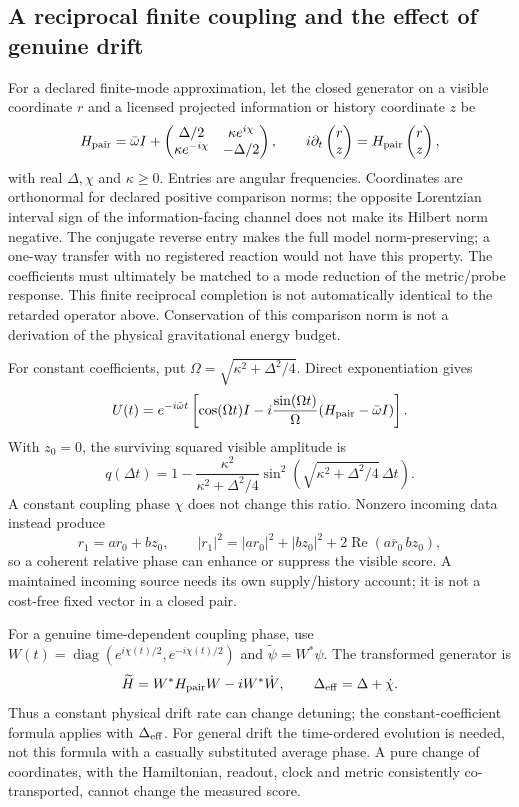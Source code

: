 \documentclass[11pt,a4paper]{article}
\begin{document}
\subsection{A reciprocal finite coupling and the effect of genuine drift}
For a declared finite-mode approximation, let the closed generator
on a visible coordinate $r$ and a licensed projected information or
history coordinate $z$ be
\[
 H_{\rm pair}=\bar\omega I+
 \begin{pmatrix}
 \Delta/2&\kappa e^{i\chi}\\
 \kappa e^{-i\chi}&-\Delta/2
 \end{pmatrix},
 \qquad i\partial_t\begin{pmatrix}r\\z\end{pmatrix}
 =H_{\rm pair}\begin{pmatrix}r\\z\end{pmatrix},
\]
with real $\Delta,\chi$ and $\kappa\ge0$. Entries are angular
frequencies. Coordinates are orthonormal for declared positive
comparison norms; the opposite Lorentzian interval sign of the
information-facing channel does not make its Hilbert norm negative.
The conjugate reverse entry makes the full model
norm-preserving; a one-way transfer with no registered reaction
would not have this property. The coefficients must ultimately be
matched to a mode reduction of the metric/probe response. This
finite reciprocal completion is not automatically identical to
the retarded operator above. Conservation of this comparison norm is
not a derivation of the physical gravitational energy budget.

For constant coefficients, put
$\Omega=\sqrt{\kappa^2+\Delta^2/4}$. Direct exponentiation gives
\[
 U(t)=e^{-i\bar\omega t}
 \left[\cos(\Omega t)I
 -i\frac{\sin(\Omega t)}{\Omega}
 (H_{\rm pair}-\bar\omega I)\right].
\]
With $z_0=0$, the surviving squared visible amplitude is
\[
 q(\Delta t)=1-
 \frac{\kappa^2}{\kappa^2+\Delta^2/4}
 \sin^2\!\left(\sqrt{\kappa^2+\Delta^2/4}\,\Delta t\right).
\]
A constant coupling phase $\chi$ does not change this ratio.
Nonzero incoming data instead produce
\[
 r_1=a r_0+b z_0,\qquad
 |r_1|^2=|a r_0|^2+|b z_0|^2
 +2\operatorname{Re}(\overline{a r_0}\,b z_0),
\]
so a coherent relative phase can enhance or suppress the visible
score. A maintained incoming source needs its own supply/history
account; it is not a cost-free fixed vector in a closed pair.

For a genuine time-dependent coupling phase, use
$W(t)=\operatorname{diag}(e^{i\chi(t)/2},e^{-i\chi(t)/2})$ and
$\widetilde\psi=W^*\psi$. The transformed generator is
\[
 \widetilde H=W^*H_{\rm pair}W-iW^*\dot W,
 \qquad \Delta_{\rm eff}=\Delta+\dot\chi.
\]
Thus a constant physical drift rate can change detuning; the
constant-coefficient formula applies with $\Delta_{\rm eff}$.
For general drift the time-ordered evolution is needed, not this
formula with a casually substituted average phase. A pure change
of coordinates, with the Hamiltonian, readout, clock and metric
consistently co-transported, cannot change the measured score.
\end{document}
